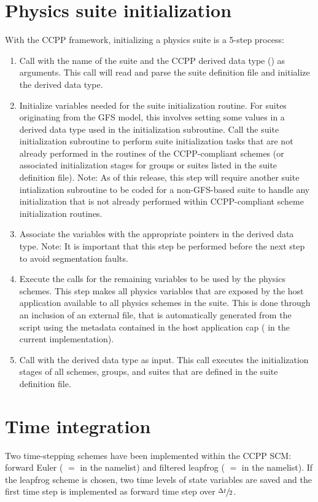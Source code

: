 \section{Physics suite initialization}
\label{section: physics init}
With the CCPP framework, initializing a physics suite is a 5-step process:
\begin{enumerate}
\item Call  with the name of the suite and the CCPP derived data type () as arguments. This call will read and parse the suite definition file and initialize the  derived data type.
\item Initialize variables needed for the suite initialization routine. For suites originating from the GFS model, this involves setting some values in a derived data type used in the initialization subroutine. Call the suite initialization subroutine to perform suite initialization tasks that are not already performed in the  routines of the CCPP-compliant schemes (or associated initialization stages for groups or suites listed in the suite definition file). Note: As of this release, this step will require another suite intialization subroutine to be coded for a non-GFS-based suite to handle any initialization that is not already performed within CCPP-compliant scheme initialization routines.
\item Associate the  variables with the appropriate pointers in the  derived data type. Note: It is important that this step be performed before the next step to avoid segmentation faults.
\item Execute the  calls for the remaining variables to be used by the physics schemes. This step makes all physics variables that are exposed by the host application available to all physics schemes in the suite. This is done through an inclusion of an external file,  that is automatically generated from the  script using the metadata contained in the host application cap ( in the current implementation).
\item Call  with the  derived data type as input. This call executes the initialization stages of all schemes, groups, and suites that are defined in the suite definition file.
\end{enumerate}

\section{Time integration}
\label{section: time integration}
Two time-stepping schemes have been implemented within the CCPP SCM: forward Euler ( $=$  in the  namelist) and filtered leapfrog ( $=$  in the  namelist). If the leapfrog scheme is chosen, two time levels of state variables are saved and the first time step is implemented as forward time step over $\sfrac{\Delta t}{2}$.

